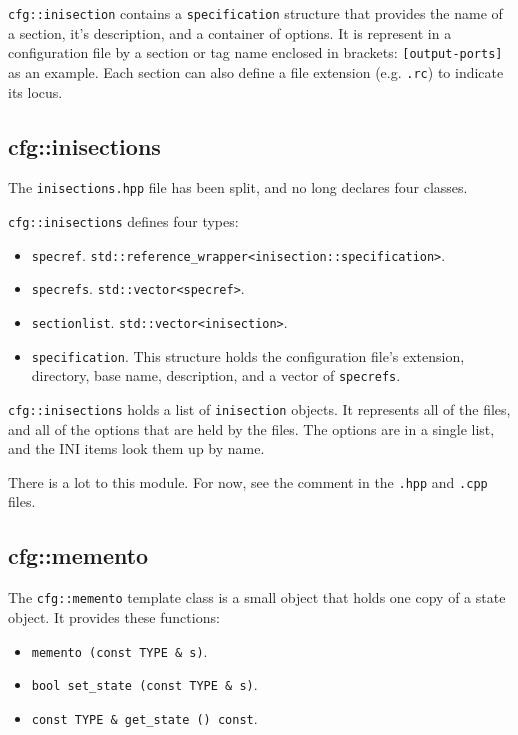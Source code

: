    \texttt{cfg::inisection}  contains a \texttt{specification} structure that
   provides the name of a section, it's description, and
   a container of options.
   It is represent in a configuration file by a section or tag name
   enclosed in brackets:  \texttt{[output-ports]} as an example.
   Each section can also define a file extension
   (e.g. \texttt{.rc}) to indicate its locus.

\subsection{cfg::inisections}
\label{subsec:cfg_namespace_inisections}

   The \texttt{inisections.hpp} file has been split,
   and no long declares four classes.

   \texttt{cfg::inisections} defines four types:

   \begin{itemize}
      \item \texttt{specref}.
          \texttt{std::reference\_wrapper<inisection::specification>}.
      \item \texttt{specrefs}.
          \texttt{std::vector<specref>}.
      \item \texttt{sectionlist}.
         \texttt{std::vector<inisection>}.
      \item \texttt{specification}.
         This structure holds the configuration file's extension,
         directory, base name, description, and a vector of
         \texttt{specrefs}.
   \end{itemize}

   \texttt{cfg::inisections} holds a list of \texttt{inisection} objects.
   It represents all of the files, and all of
   the options that are held by the files.
   The options are in a single list,
   and the INI items look them up by name.

   There is a lot to this module.
   For now, see the comment in the \texttt{.hpp} and \texttt{.cpp} files.

\subsection{cfg::memento}
\label{subsec:cfg_namespace_memento}

   The \texttt{cfg::memento} template class is a small object that holds one
   copy of a state object.
   It provides these functions:

   \begin{itemize}
      \item \texttt{memento (const TYPE \& s)}.
      \item \texttt{bool set\_state (const TYPE \& s)}.
      \item \texttt{const TYPE \& get\_state () const}.
   \end{itemize}

